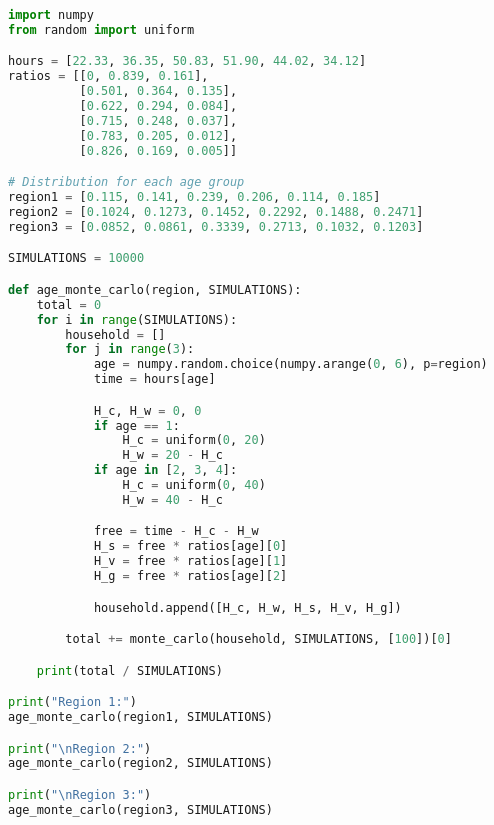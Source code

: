 \documentclass[12pt]{article}
\begin{document}
\begin{lstlisting}[language=Python]
import numpy
from random import uniform

hours = [22.33, 36.35, 50.83, 51.90, 44.02, 34.12]
ratios = [[0, 0.839, 0.161],
          [0.501, 0.364, 0.135],
          [0.622, 0.294, 0.084],
          [0.715, 0.248, 0.037],
          [0.783, 0.205, 0.012],
          [0.826, 0.169, 0.005]]

# Distribution for each age group
region1 = [0.115, 0.141, 0.239, 0.206, 0.114, 0.185]
region2 = [0.1024, 0.1273, 0.1452, 0.2292, 0.1488, 0.2471]
region3 = [0.0852, 0.0861, 0.3339, 0.2713, 0.1032, 0.1203]

SIMULATIONS = 10000

def age_monte_carlo(region, SIMULATIONS):
    total = 0
    for i in range(SIMULATIONS):
        household = []
        for j in range(3):
            age = numpy.random.choice(numpy.arange(0, 6), p=region)
            time = hours[age]

            H_c, H_w = 0, 0
            if age == 1:
                H_c = uniform(0, 20)
                H_w = 20 - H_c
            if age in [2, 3, 4]:
                H_c = uniform(0, 40)
                H_w = 40 - H_c

            free = time - H_c - H_w
            H_s = free * ratios[age][0]
            H_v = free * ratios[age][1]
            H_g = free * ratios[age][2]

            household.append([H_c, H_w, H_s, H_v, H_g])

        total += monte_carlo(household, SIMULATIONS, [100])[0]

    print(total / SIMULATIONS)

print("Region 1:")
age_monte_carlo(region1, SIMULATIONS)

print("\nRegion 2:")
age_monte_carlo(region2, SIMULATIONS)

print("\nRegion 3:")
age_monte_carlo(region3, SIMULATIONS)
\end{lstlisting}

\pagebreak
\printbibliography[heading=bibintoc, title={Works Cited}]
\end{document}
